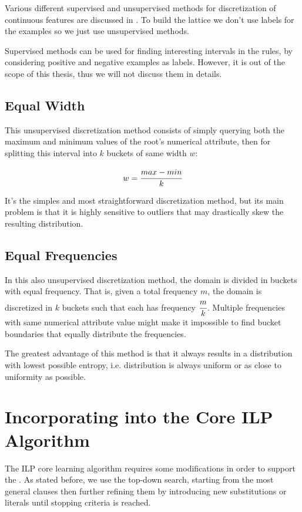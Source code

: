 Various different supervised and unsupervised methods for discretization of continuous features are discussed in
\cite{Dougherty95supervisedand}. To build the lattice we don't use labels for the examples so we just use unsupervised
methods.

Supervised methods can be used for finding interesting intervals in the rules, by considering positive and negative
examples as labels. However, it is out of the scope of this thesis, thus we will not discuss them in details.

\subsection{Equal Width}
This unsupervised discretization method consists of simply querying both the maximum and minimum values of the root's
numerical attribute, then for splitting this interval into $k$ buckets of same width $w$:

\begin{equation}
 w=\cfrac{max-min}{k}
\end{equation}

It's the simples and most straightforward discretization method, but its main problem is that it is highly
sensitive to outliers that may drastically skew the resulting distribution.

\subsection{Equal Frequencies}
In this also unsupervised discretization method, the domain is divided in buckets with equal frequency. That is, given a
total frequency $m$, the domain is discretized in $k$ buckets such that each has frequency $\cfrac{m}{k}$. Multiple
frequencies with same numerical attribute value might make it impossible to find bucket boundaries that equally
distribute the frequencies.

The greatest advantage of this method is that it always results in a distribution with lowest possible entropy, i.e.
distribution is always uniform or as close to uniformity as possible.

\section{Incorporating \graphname into the Core ILP Algorithm}

The ILP core learning algorithm requires some modifications in order to support the \graphname. As stated before, we use
the top-down search, starting from the most general clauses then further refining them by introducing new substitutions
or literals until stopping criteria is reached.

